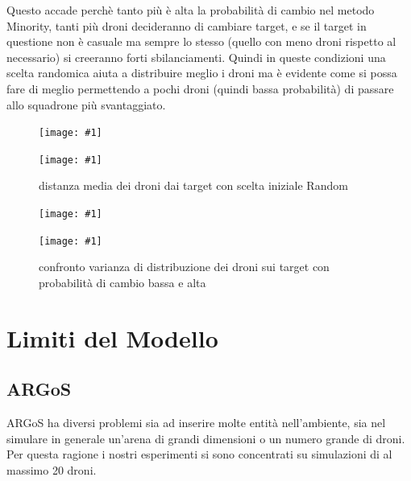 \documentclass[a4paper,11pt,oneside, table]{article}
\newcommand{\putsubimage}[5] {
  \begin{minipage}{{#4}\linewidth}
	    \centering
      \texttt{[image: \#1]}
	    \caption{#2}\label{#3}
	\end{minipage}
}
\newcommand{\putimagecouple}[2] {
  \begin{figure}[!htb]
      \centering
      #1
      \hspace{0.5cm}
      #2
  \end{figure}
}
\begin{document}
Questo accade perch\`e tanto pi\`u \`e alta la probabilit\`a di cambio nel metodo Minority, tanti pi\`u droni decideranno di cambiare target, e se il target in questione non \`e casuale ma sempre lo stesso (quello con meno droni rispetto al necessario) si creeranno forti sbilanciamenti. 
Quindi in queste condizioni una scelta randomica aiuta a distribuire meglio i droni ma \`e evidente come si possa fare di meglio permettendo a pochi droni (quindi bassa probabilit\`a) di passare allo squadrone pi\`u svantaggiato.

\putimagecouple
{\putsubimage{images/experiments/task-allocator-nearest-shortened/MeanDistanceFromTarget.png}{distanza media dei droni dai target con scelta iniziale Nearest}{png:task-allocator-nearest-shortened-MeanDistanceFromTarget}{0.4}{0.99}}
{\putsubimage{images/experiments/task-allocator-random-shortened/MeanDistanceFromTarget.png}{distanza media dei droni dai target con scelta iniziale Random}{png:task-allocator-random-shortened-MeanDistanceFromTarget}{0.4}{0.99}}

\putimagecouple
{\putsubimage{images/experiments/task-allocator-random-shortened/VarTargetDensityOverTime.png}{varianza di distribuzione dei droni sui target con probabilit\`a di cambio bassa}{png:task-allocator-random-shortened-VarTargetDensityOverTime}{0.4}{0.99}}
{\putsubimage{images/experiments/task-allocator-random-always/VarTargetDensityOverTime.png}{confronto varianza di distribuzione dei droni sui target con probabilit\`a di cambio bassa e alta}{png:task-allocator-random-always-VarTargetDensityOverTime}{0.4}{0.99}}

\pagebreak

\section{Limiti del Modello}

\subsection{ARGoS}

ARGoS ha diversi problemi sia ad inserire molte entit\`a nell'ambiente, sia nel simulare in generale un'arena di grandi dimensioni o un numero grande di droni.
Per questa ragione i nostri esperimenti si sono concentrati su simulazioni di al massimo 20 droni.
\end{document}
